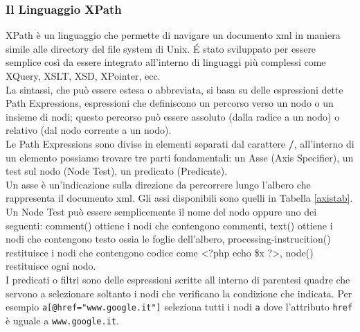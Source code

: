 \documentclass[12pt,a4paper,openright,twoside]{report}
\theoremstyle{definition}
\begin{document}
\subsubsection{Il Linguaggio XPath}
XPath è un linguaggio che permette di navigare un documento xml in maniera simile alle directory del file system di Unix. \'{E} stato sviluppato per essere semplice così da essere integrato all'interno di linguaggi più complessi come XQuery, XSLT, XSD, XPointer, ecc.\\
La sintassi, che può essere estesa o abbreviata, si basa su delle espressioni dette Path Expressions, espressioni che definiscono un percorso verso un nodo o un insieme di nodi; questo percorso può essere assoluto (dalla radice a un nodo) o relativo (dal nodo corrente a un nodo).\\
Le Path Expressions sono divise in elementi separati dal carattere \textbf{/}, all'interno di un elemento possiamo trovare tre parti fondamentali: un Asse (Axis Specifier), un test sul nodo (Node Test), un predicato (Predicate).\\
Un asse è un'indicazione sulla direzione da percorrere lungo l'albero che rappresenta il documento xml. Gli assi disponibili sono quelli in Tabella \ref{axistab}.
\\
Un Node Test può essere semplicemente il nome del nodo oppure uno dei seguenti: comment() ottiene i nodi che contengono commenti, text() ottiene i nodi che contengono testo ossia le foglie dell'albero, processing-instrucition() restituisce i nodi che contengono codice come <?php echo \$x ?>, node() restituisce ogni nodo.
\\
I predicati o filtri sono delle espressioni scritte all interno di parentesi quadre che servono a selezionare soltanto i nodi che verificano la condizione che indicata. Per esempio \texttt{a[@href="www.google.it"]} seleziona tutti i nodi \texttt{a} dove l'attributo \texttt{href} è uguale a \texttt{www.google.it}.
\end{document}

